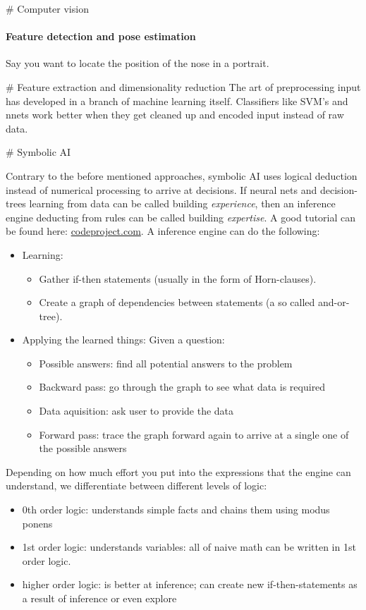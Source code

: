 # Computer vision

\paragraph{Feature detection and pose estimation}

Say you want to locate the position of the nose in a portrait. 



# Feature extraction and dimensionality reduction
The art of preprocessing input has developed in a branch of machine learning itself. Classifiers like SVM's and nnets work better when they get cleaned up and encoded input instead of raw data. 



# Symbolic AI

Contrary to the before mentioned approaches, symbolic AI uses logical deduction instead of numerical processing to arrive at decisions. If neural nets and decision-trees learning from data can be called building \emph{experience}, then an inference engine deducting from rules can be called building \emph{expertise}. A good tutorial can be found here: \href{codeproject.com/Articles/179375/Man-Marriage-and-Machine-Adventures-in-Artificia}{codeproject.com}.
A inference engine can do the following: 
\begin{itemize}
	\item Learning: 
		\begin{itemize}
			\item Gather if-then statements (usually in the form of Horn-clauses).
			\item Create a graph of dependencies between statements (a so called and-or-tree).
		\end{itemize}
	\item Applying the learned things: Given a question: 
		\begin{itemize}
			\item Possible answers: find all potential answers to the problem
			\item Backward pass: go through the graph to see what data is required
			\item Data aquisition: ask user to provide the data
			\item Forward pass: trace the graph forward again to arrive at a single one of the possible answers
		\end{itemize}
\end{itemize}

Depending on how much effort you put into the expressions that the engine can understand, we differentiate between different levels of logic: 
\begin{itemize}
    \item 0th order logic: understands simple facts and chains them using modus ponens
    \item 1st order logic: understands variables: all of naive math can be written in 1st order logic.
    \item higher order logic: is better at inference; can create new if-then-statements as a result of inference or even explore
\end{itemize}

